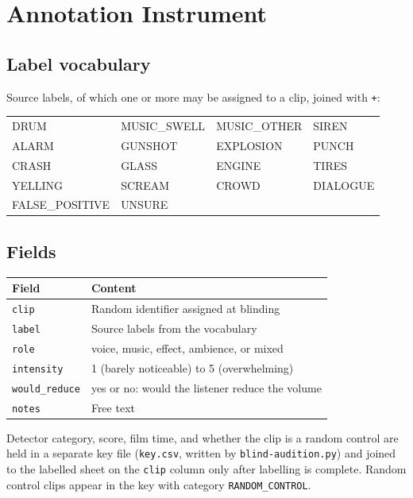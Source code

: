\chapter{Annotation Instrument}
\label{app:instrument}

\section{Label vocabulary}

Source labels, of which one or more may be assigned to a clip, joined with \texttt{+}:

\begin{center}\small
\begin{tabular}{llll}
DRUM & MUSIC\_SWELL & MUSIC\_OTHER & SIREN \\
ALARM & GUNSHOT & EXPLOSION & PUNCH \\
CRASH & GLASS & ENGINE & TIRES \\
YELLING & SCREAM & CROWD & DIALOGUE \\
FALSE\_POSITIVE & UNSURE & & \\
\end{tabular}
\end{center}

\section{Fields}

\begin{center}\small
\begin{tabularx}{\linewidth}{lX}
\toprule
Field & Content \\
\midrule
\texttt{clip} & Random identifier assigned at blinding \\
\texttt{label} & Source labels from the vocabulary \\
\texttt{role} & voice, music, effect, ambience, or mixed \\
\texttt{intensity} & 1 (barely noticeable) to 5 (overwhelming) \\
\texttt{would\_reduce} & yes or no: would the listener reduce the volume \\
\texttt{notes} & Free text \\
\bottomrule
\end{tabularx}
\end{center}

Detector category, score, film time, and whether the clip is a random control are held in a separate key file (\texttt{key.csv}, written by \texttt{blind-audition.py}) and joined to the labelled sheet on the \texttt{clip} column only after labelling is complete. Random control clips appear in the key with category \texttt{RANDOM\_CONTROL}.

